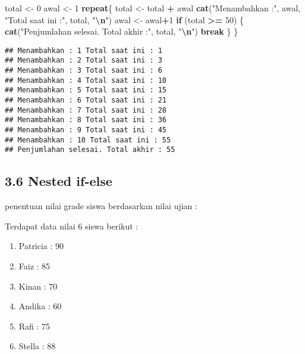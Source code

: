 \documentclass[
]{article}
\newenvironment{Shaded}{\begin{snugshade}}{\end{snugshade}}
\newcommand{\ControlFlowTok}[1]{\textcolor[rgb]{0.13,0.29,0.53}{\textbf{#1}}}
\newcommand{\DecValTok}[1]{\textcolor[rgb]{0.00,0.00,0.81}{#1}}
\newcommand{\FunctionTok}[1]{\textcolor[rgb]{0.13,0.29,0.53}{\textbf{#1}}}
\newcommand{\NormalTok}[1]{#1}
\newcommand{\OtherTok}[1]{\textcolor[rgb]{0.56,0.35,0.01}{#1}}
\newcommand{\SpecialCharTok}[1]{\textcolor[rgb]{0.81,0.36,0.00}{\textbf{#1}}}
\newcommand{\StringTok}[1]{\textcolor[rgb]{0.31,0.60,0.02}{#1}}
\providecommand{\tightlist}{%
  \setlength{\itemsep}{0pt}\setlength{\parskip}{0pt}}
\begin{document}
\begin{Shaded}
\begin{Highlighting}[]
\NormalTok{total }\OtherTok{\textless{}{-}} \DecValTok{0}
\NormalTok{awal }\OtherTok{\textless{}{-}} \DecValTok{1}
\ControlFlowTok{repeat}\NormalTok{\{}
\NormalTok{  total }\OtherTok{\textless{}{-}}\NormalTok{ total }\SpecialCharTok{+}\NormalTok{ awal}
  \FunctionTok{cat}\NormalTok{(}\StringTok{"Menambahkan :"}\NormalTok{, awal, }\StringTok{"Total saat ini :"}\NormalTok{, total, }\StringTok{"}\SpecialCharTok{\textbackslash{}n}\StringTok{"}\NormalTok{)}
\NormalTok{  awal }\OtherTok{\textless{}{-}}\NormalTok{ awal}\SpecialCharTok{+}\DecValTok{1}
  \ControlFlowTok{if}\NormalTok{ (total }\SpecialCharTok{\textgreater{}=} \DecValTok{50}\NormalTok{) \{}
    \FunctionTok{cat}\NormalTok{(}\StringTok{"Penjumlahan selesai. Total akhir :"}\NormalTok{, total, }\StringTok{"}\SpecialCharTok{\textbackslash{}n}\StringTok{"}\NormalTok{)}
    \ControlFlowTok{break}
\NormalTok{  \}}
\NormalTok{\}}
\end{Highlighting}
\end{Shaded}

\begin{verbatim}
## Menambahkan : 1 Total saat ini : 1 
## Menambahkan : 2 Total saat ini : 3 
## Menambahkan : 3 Total saat ini : 6 
## Menambahkan : 4 Total saat ini : 10 
## Menambahkan : 5 Total saat ini : 15 
## Menambahkan : 6 Total saat ini : 21 
## Menambahkan : 7 Total saat ini : 28 
## Menambahkan : 8 Total saat ini : 36 
## Menambahkan : 9 Total saat ini : 45 
## Menambahkan : 10 Total saat ini : 55 
## Penjumlahan selesai. Total akhir : 55
\end{verbatim}

\subsection{3.6 Nested if-else}\label{nested-if-else}

penentuan nilai grade siswa berdasarkan nilai ujian :

Terdapat data nilai 6 siswa berikut :

\begin{enumerate}
\def\labelenumi{\arabic{enumi}.}
\tightlist
\item
  Patricia : 90
\item
  Faiz : 85
\item
  Kinan : 70
\item
  Andika : 60
\item
  Rafi : 75
\item
  Stella : 88
\end{enumerate}
\end{document}
